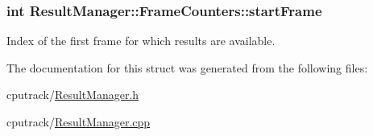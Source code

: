 \subsubsection[{\texorpdfstring{start\+Frame}{startFrame}}]{\setlength{\rightskip}{0pt plus 5cm}int Result\+Manager\+::\+Frame\+Counters\+::start\+Frame}\hypertarget{struct_result_manager_1_1_frame_counters_a91cdacd9e2418fc49cdebabc171a1aa6}{}\label{struct_result_manager_1_1_frame_counters_a91cdacd9e2418fc49cdebabc171a1aa6}


Index of the first frame for which results are available. 



The documentation for this struct was generated from the following files\+:\begin{DoxyCompactItemize}
\item 
cputrack/\hyperlink{_result_manager_8h}{Result\+Manager.\+h}\item 
cputrack/\hyperlink{_result_manager_8cpp}{Result\+Manager.\+cpp}\end{DoxyCompactItemize}
